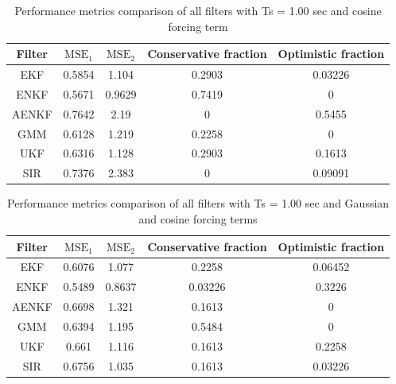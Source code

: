 \documentclass[]{article}
\begin{document}
\begin{table}[h!]
\centering
\begin{tabular}{|c|c|c|c|c|}
\hline
Filter & $\mathrm{MSE}_1$ & $\mathrm{MSE}_2$ & Conservative fraction & Optimistic fraction \\
\hline
EKF &   0.5854 &    1.104 &   0.2903 &  0.03226 \\
\hline
ENKF &   0.5671 &   0.9629 &   0.7419 &        0 \\
\hline
AENKF &   0.7642 &     2.19 &        0 &   0.5455 \\
\hline
GMM &   0.6128 &    1.219 &   0.2258 &        0 \\
\hline
UKF &   0.6316 &    1.128 &   0.2903 &   0.1613 \\
\hline
SIR &   0.7376 &    2.383 &        0 &  0.09091 \\
\hline
\end{tabular}
\caption{Performance metrics comparison of all filters with Ts = 1.00 sec and cosine forcing term}
\label{table:compare_case_2_sample_2}
\end{table}


\begin{table}[h!]
\centering
\begin{tabular}{|c|c|c|c|c|}
\hline
Filter & $\mathrm{MSE}_1$ & $\mathrm{MSE}_2$ & Conservative fraction & Optimistic fraction \\
\hline
EKF &   0.6076 &    1.077 &   0.2258 &  0.06452 \\
\hline
ENKF &   0.5489 &   0.8637 &  0.03226 &   0.3226 \\
\hline
AENKF &   0.6698 &    1.321 &   0.1613 &        0 \\
\hline
GMM &   0.6394 &    1.195 &   0.5484 &        0 \\
\hline
UKF &    0.661 &    1.116 &   0.1613 &   0.2258 \\
\hline
SIR &   0.6756 &    1.035 &   0.1613 &  0.03226 \\
\hline
\end{tabular}
\caption{Performance metrics comparison of all filters with Ts = 1.00 sec and Gaussian and cosine forcing terms}
\label{table:compare_case_3_sample_2}
\end{table}



\end{document}
